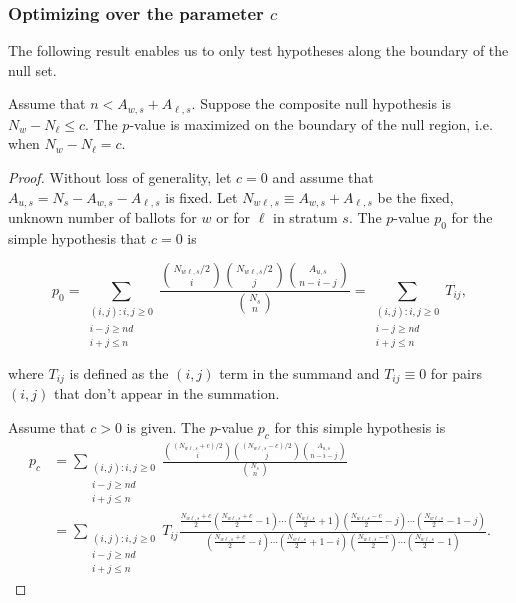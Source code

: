 \subsubsection{Optimizing over the parameter $c$}
The following result enables us to only test hypotheses along the boundary of the null set.

\begin{thm}
Assume that $n < A_{w,s}+A_{\ell,s}$.
Suppose the composite null hypothesis is $N_w - N_\ell \leq c$.
The $p$-value is maximized on the boundary of the null region, i.e. when $N_w - N_\ell = c$.
\end{thm}

\begin{proof}
Without loss of generality, let $c=0$ and assume that $A_{u,s}=N_s - A_{w,s} - A_{\ell,s}$ is fixed.
Let $N_{w\ell, s} \equiv A_{w,s}+A_{\ell,s}$ be the fixed, unknown number of ballots for $w$ or for $\ell$ in stratum $s$.
The $p$-value $p_0$ for the simple hypothesis that $c=0$ is

\begin{equation}
  p_0 = \sum_{\substack{(i, j) :  i, j\ge 0 \\ i-j \geq nd \\ i+j \leq n}} \frac{ {N_{w\ell, s}/2 \choose i}{N_{w\ell, s}/2 \choose j}{A_{u,s} \choose n-i-j}}{{N_s \choose n}} =  \sum_{\substack{(i, j) :  i, j\ge 0 \\ i-j \geq nd \\ i+j \leq n}}T_{ij},
\end{equation}

where $T_{ij}$ is defined as the $(i, j)$ term in the summand and $T_{ij} \equiv 0$ for pairs $(i, j)$ that don't appear in the summation.

Assume that $c>0$ is given.
The $p$-value $p_c$ for this simple hypothesis is
\begin{align*}
p_c &=   \sum_{\substack{(i, j) :  i, j\ge 0 \\ i-j \geq nd \\ i+j \leq n}} \frac{ {(N_{w\ell, s}+c)/2 \choose i}{(N_{w\ell, s}-c)/2 \choose j}{A_{u,s} \choose n-i-j}}{{N_s \choose n}}  \\
   &= \sum_{\substack{(i, j) :  i, j\ge 0 \\ i-j \geq nd \\ i+j \leq n}}T_{ij} \frac{ \frac{N_{w\ell, s}+c}{2}(\frac{N_{w\ell, s}+c}{2}-1)\cdots(\frac{N_{w\ell, s}}{2}+1) (\frac{N_{w\ell, s}-c}{2} -j)\cdots(\frac{N_{w\ell, s}}{2}-1-j) }
   {(\frac{N_{w\ell, s}+c}{2} -i)\cdots(\frac{N_{w\ell, s}}{2}+1-i)(\frac{N_{w\ell, s}-c}{2})\cdots(\frac{N_{w\ell, s}}{2}-1)}.
\end{align*}


\end{proof}
